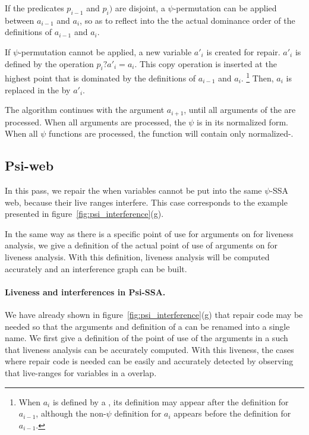 If the predicates ${p_{i-1}}$ and ${p_i})$ are disjoint, a
$\psi$-permutation can be applied between ${a_{i-1}}$ and
${a_i}$, so as to reflect into the \psifun the actual
dominance order of the definitions of ${a_{i-1}}$ and ${a_i}$.

If $\psi$-permutation cannot be applied, a new variable ${a'_i}$
is created for repair. ${a'_i}$ is defined by the operation
${p_i? a'_i = a_i}$. This copy operation is inserted at the highest
point that is dominated by the definitions of ${a_{i-1}}$ and
${a_i}$.
\footnote{When ${a_i}$ is defined by a \psifun, its
  definition may appear after the definition for ${a_{i-1}}$,
  although the non-$\psi$ definition for ${a_i}$ appears before
  the definition for ${a_{i-1}}$.}
Then, ${a_i}$ is replaced in the \psifun by ${a'_i}$.

The algorithm continues with the argument ${a_{i+1}}$, until all
arguments of the \psifun are processed. When all arguments
are processed, the $\psi$ is in its normalized form. When all $\psi$
functions are processed, the function will contain only
normalized-\psifuns.


\subsection{Psi-web}

In this pass, we repair the \psifuns when variables cannot be
put into the same $\psi$-SSA web, because their live ranges
interfere. This case corresponds to the example presented in
figure~\ref{fig:psi_interference}(g).

In the same way as there is a specific point of use for arguments on
\phifuns for liveness analysis, we give a definition of the
actual point of use of arguments on \psifuns for liveness
analysis. With this definition, liveness analysis will be computed
accurately and an interference graph can be built.

\paragraph{Liveness and interferences in Psi-SSA.}
We have already shown in figure~\ref{fig:psi_interference}(g) that
repair code may be needed so that the arguments and definition of a
\psifun can be renamed into a single name. We first give a
definition of the point of use of the arguments in a \psifun
such that liveness analysis can be accurately computed. With this
liveness, the cases where repair code is needed can be easily and
accurately detected by observing that live-ranges for variables in a
\psifun overlap.

